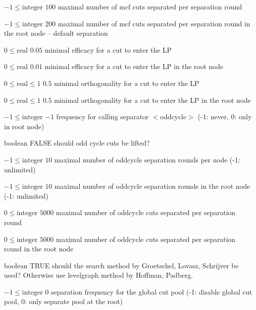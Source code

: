 %
{$-1\leq\textrm{integer}$}%
{$100$}%
{maximal number of mcf cuts separated per separation round}%
{}

%
{$-1\leq\textrm{integer}$}%
{$200$}%
{maximal number of mcf cuts separated per separation round in the root node  -- default separation}%
{}

%
{$0\leq\textrm{real}$}%
{$0.05$}%
{minimal efficacy for a cut to enter the LP}%
{}

%
{$0\leq\textrm{real}$}%
{$0.01$}%
{minimal efficacy for a cut to enter the LP in the root node}%
{}

%
{$0\leq\textrm{real}\leq1$}%
{$0.5$}%
{minimal orthogonality for a cut to enter the LP}%
{}

%
{$0\leq\textrm{real}\leq1$}%
{$0.5$}%
{minimal orthogonality for a cut to enter the LP in the root node}%
{}

%
{$-1\leq\textrm{integer}$}%
{$-1$}%
{frequency for calling separator $<$oddcycle$>$ (-1: never, 0: only in root node)}%
{}

%
{boolean}%
{FALSE}%
{should odd cycle cuts be lifted?}%
{}

%
{$-1\leq\textrm{integer}$}%
{$10$}%
{maximal number of oddcycle separation rounds per node (-1: unlimited)}%
{}

%
{$-1\leq\textrm{integer}$}%
{$10$}%
{maximal number of oddcycle separation rounds in the root node (-1: unlimited)}%
{}

%
{$0\leq\textrm{integer}$}%
{$5000$}%
{maximal number of oddcycle cuts separated per separation round}%
{}

%
{$0\leq\textrm{integer}$}%
{$5000$}%
{maximal number of oddcycle cuts separated per separation round in the root node}%
{}

%
{boolean}%
{TRUE}%
{should the search method by Groetschel, Lovasz, Schrijver be used? Otherwise use levelgraph method by Hoffman, Padberg.}%
{}

%
{$-1\leq\textrm{integer}$}%
{$0$}%
{separation frequency for the global cut pool (-1: disable global cut pool, 0: only separate pool at the root)}%
{}

